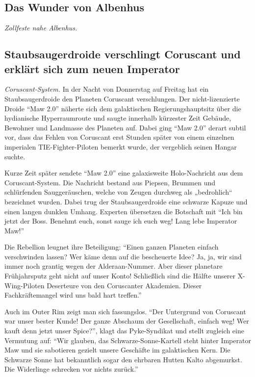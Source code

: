 \documentclass[final]{multiversum}
\begin{document}
\subsection{Das Wunder von Albenhus}
\textit{Zollfeste nahe Albenhus.} 

\subsection{Staubsaugerdroide verschlingt Coruscant und erklärt sich zum neuen Imperator}

\textit{Coruscant-System.} 
In der Nacht von Donnerstag auf Freitag hat ein Staubsaugerdroide den Planeten Coruscant verschlungen. 
Der nicht-lizenzierte Droide \enquote{Maw 2.0} näherte sich dem galaktischen Regierungshauptsitz über die hydianische Hyperraumroute und saugte innerhalb kürzester Zeit Gebäude, Bewohner und Landmasse des Planeten auf. 
Dabei ging \enquote{Maw 2.0} derart subtil vor, dass das Fehlen von Coruscant erst Stunden später von einem einzelnen imperialen TIE-Fighter-Piloten bemerkt wurde, der vergeblich seinen Hangar suchte. 

Kurze Zeit später sendete \enquote{Maw 2.0} eine galaxisweite Holo-Nachricht aus dem Coruscant-System. 
Die Nachricht bestand aus Piepsen, Brummen und schlürfenden Sauggeräuschen, welche von Zeugen durchweg als „bedrohlich“ bezeichnet wurden. 
Dabei trug der Staubsaugerdroide eine schwarze Kapuze und einen langen dunklen Umhang. 
Experten übersetzen die Botschaft mit \enquote{Ich bin jetzt der Boss. 
Benehmt euch, sonst sauge ich euch weg! Lang lebe Imperator Maw!}

Die Rebellion leugnet ihre Beteiligung: \enquote{Einen ganzen Planeten einfach verschwinden lassen? 
Wer käme denn auf die bescheuerte Idee? 
Ja, ja, wir sind immer noch grantig wegen der Alderaan-Nummer. 
Aber dieser planetare Frühjahrsputz geht nicht auf unser Konto! 
Schließlich sind die Hälfte unserer X-Wing-Piloten Deserteure von den Coruscanter Akademien. 
Dieser Fachkräftemangel wird uns bald hart treffen.}

Auch im Outer Rim zeigt man sich fassungslos. 
\enquote{Der Untergrund von Coruscant war unser bester Kunde! 
Der ganze Abschaum der Gesellschaft, einfach weg! 
Wer kauft denn jetzt unser Spice?}, klagt das Pyke-Syndikat und stellt zugleich eine Vermutung auf: 
\enquote{Wir glauben, das Schwarze-Sonne-Kartell steht hinter Imperator Maw und sie sabotieren gezielt unsere Geschäfte im galaktischen Kern. 
Die Schwarze Sonne hat bekanntlich sogar den ehrbaren Hutten Kalto abgemurkst. 
Die Widerlinge schrecken vor nichts zurück.}
\end{document}
